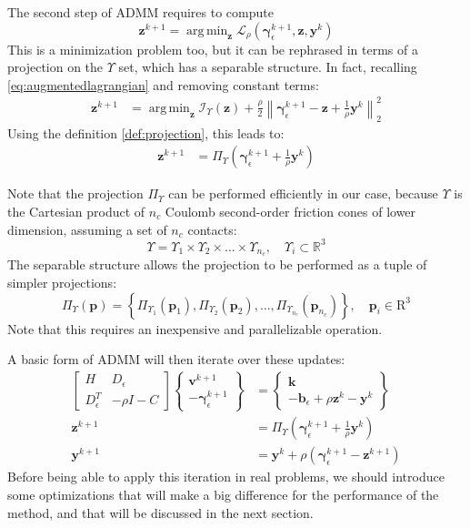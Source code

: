 \documentclass[final,3p]{elsarticle}
\newcommand{\vect}[1]{\bm{#1}}
\newcommand{\norm}[1]{\left\lVert#1\right\rVert}
\DeclareMathOperator*{\argmin}{arg\,min} %
\begin{document}
The second step of ADMM requires to compute 
\[
\vect{z}^{k+1} = \argmin_{\vect{z}} 
\mathcal{L}_{\rho} \left(\vect{\gamma}_\epsilon^{k+1},\vect{z},\vect{y}^k\right)
\] 
%
This is a minimization problem too, but it can be rephrased in terms of a projection on the $\Upsilon$ set, which has a separable structure.
In fact, recalling \eqref{eq:augmentedlagrangian} and removing constant terms: 
\begin{align}
\vect{z}^{k+1} &= \argmin_{\vect{z}}  
\mathcal{I}_\Upsilon(\vect{z}) 
+ \frac{\rho}{2} \norm{ \vect{\gamma}_\epsilon^{k+1} - \vect{z} + \frac{1}{\rho} \vect{y}^k}_2^2
\end{align}
%
Using the definition \ref{def:projection}, this leads to:
\begin{align}
\vect{z}^{k+1} &= \Pi_\Upsilon \left(  \vect{\gamma}_\epsilon^{k+1} +\frac{1}{\rho} \vect{y}^k \right )
\end{align}

Note that the projection $\Pi_\Upsilon$ can be performed efficiently in our case, because $\Upsilon$ is the Cartesian product of $n_c$ Coulomb second-order friction cones of lower dimension, assuming a set of $n_c$ contacts:
\[
\Upsilon = \Upsilon_1 \times \Upsilon_2 \times \ldots \times \Upsilon_{n_c}, \quad \Upsilon_i \subset \mathbb{R}^3
\]
The separable structure allows the projection to be performed as a tuple of simpler projections:
\[
\Pi_\Upsilon(\vect{p}) = \left\{ \Pi_{\Upsilon_1}(\vect{p}_1), \Pi_{\Upsilon_2}(\vect{p}_2), \ldots,  \Pi_{\Upsilon_{n_c}}(\vect{p}_{n_c}) \right\}, \quad \vect{p}_i \in \mathrm{R}^3
\]
%
Note that this requires an inexpensive and parallelizable operation.

A basic form of ADMM will then iterate over these updates:
\begin{align}
    \begin{bmatrix}
		 H   & D_\epsilon \\
		 D_\epsilon^T & - \rho I - C
		\end{bmatrix}
		\begin{Bmatrix}
		 \vect{v}^{k+1}   \\
		 -\vect{\gamma}_\epsilon^{k+1} 
		\end{Bmatrix}
		&=
		\begin{Bmatrix}
		 \vect{k} \\
		 -\vect{b}_\epsilon + \rho \vect{z}^k -\vect{y}^k 
		\end{Bmatrix} \label{eq:admm_step1} \\
		\vect{z}^{k+1} &= \Pi_\Upsilon \left(  \vect{\gamma}_\epsilon^{k+1} +\frac{1}{\rho} \vect{y}^k \right ) \label{eq:admm_step2} \\
		\vect{y}^{k+1} &= \vect{y}^k + \rho \left( \vect{\gamma}_\epsilon^{k+1} - \vect{z}^{k+1} \right) \label{eq:admm_step3}
\end{align}
%
Before being able to apply this iteration in real problems, we should introduce some optimizations that will make a big difference for the performance of the method, and that will be discussed in the next section.
\end{document}
